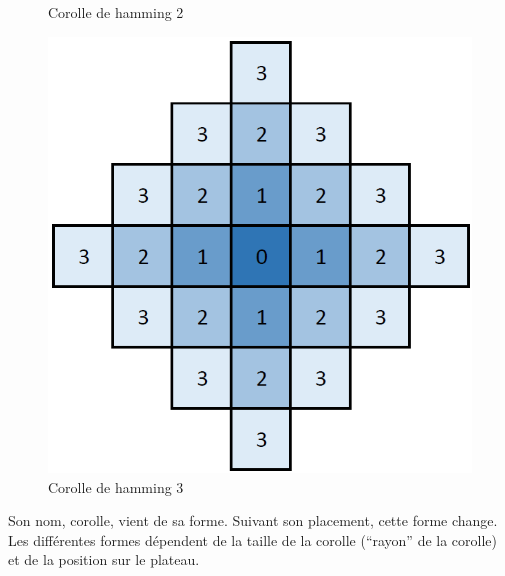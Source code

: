 \begin{figure}[H]
\begin{minipage}[t]{0.33\textwidth}
			\caption{Corolle de hamming 2}\label{fig:corolle_hamming_2}
		\end{minipage}\hfill
		\begin{minipage}[t]{0.33\textwidth}
			\includegraphics[width=\linewidth]{images/corolle_hamming_3.png}
			\caption{Corolle de hamming 3}\label{fig:corolle_hamming_3}
		\end{minipage}\hfill
	\end{figure}

	Son nom, corolle, vient de sa forme. Suivant son placement, cette forme change. Les différentes formes dépendent de la taille de la corolle (\enquote{rayon} de la corolle) et de la position sur le plateau.
		

